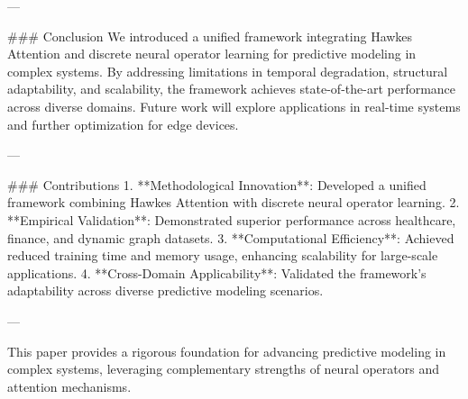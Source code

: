 ---

### Conclusion
We introduced a unified framework integrating Hawkes Attention and discrete neural operator learning for predictive modeling in complex systems. By addressing limitations in temporal degradation, structural adaptability, and scalability, the framework achieves state-of-the-art performance across diverse domains. Future work will explore applications in real-time systems and further optimization for edge devices.

---

### Contributions
1. **Methodological Innovation**: Developed a unified framework combining Hawkes Attention with discrete neural operator learning.
2. **Empirical Validation**: Demonstrated superior performance across healthcare, finance, and dynamic graph datasets.
3. **Computational Efficiency**: Achieved reduced training time and memory usage, enhancing scalability for large-scale applications.
4. **Cross-Domain Applicability**: Validated the framework's adaptability across diverse predictive modeling scenarios.

---

This paper provides a rigorous foundation for advancing predictive modeling in complex systems, leveraging complementary strengths of neural operators and attention mechanisms.